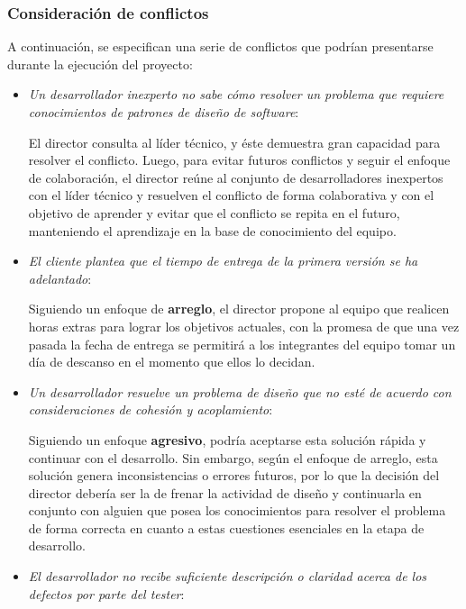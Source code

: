 \subsubsection{Consideración de conflictos}

A continuación, se especifican una serie de conflictos que podrían presentarse durante la ejecución del proyecto:

\begin{itemize}

\item \textit{Un desarrollador inexperto no sabe cómo resolver un problema que requiere conocimientos de patrones de diseño de software}:

El director consulta al líder técnico, y éste demuestra gran capacidad para resolver el conflicto.
Luego, para evitar futuros conflictos y seguir el enfoque de colaboración, el director reúne al conjunto de desarrolladores inexpertos con el líder técnico y resuelven el conflicto de forma colaborativa y con el objetivo de aprender y evitar que el conflicto se repita en el futuro, manteniendo el aprendizaje en la base de conocimiento del equipo.

\item \textit{El cliente plantea que el tiempo de entrega de la primera versión se ha adelantado}:

Siguiendo un enfoque de \textbf{arreglo}, el director propone al equipo que realicen horas extras para lograr los objetivos actuales, con la promesa de que una vez pasada la fecha de entrega se permitirá a los integrantes del equipo tomar un día de descanso en el momento que ellos lo decidan.

\item \textit{Un desarrollador resuelve un problema de diseño que no esté de acuerdo con consideraciones de cohesión y acoplamiento}:

Siguiendo un enfoque \textbf{agresivo}, podría aceptarse esta solución rápida y continuar con el desarrollo.
Sin embargo, según el enfoque de arreglo, esta solución genera inconsistencias o errores futuros, por lo que la decisión del director debería ser la de frenar la actividad de diseño y continuarla en conjunto con alguien que posea los conocimientos para resolver el problema de forma correcta en cuanto a estas cuestiones esenciales en la etapa de desarrollo.

\item \textit{El desarrollador no recibe suficiente descripción o claridad acerca de los defectos por parte del tester}:


\end{itemize}

